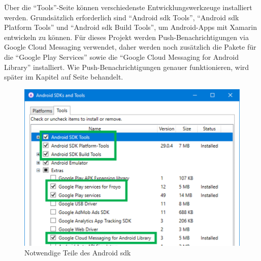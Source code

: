 Über die \enquote{Tools}-Seite können verschiedenste Entwicklungswerkzeuge installiert werden.
Grundsätzlich erforderlich sind \enquote{Android \acs{sdk} Tools}, \enquote{Android \acs{sdk} Platform Tools} und \enquote{Android \acs{sdk} Build Tools}, um Android-Apps mit Xamarin entwickeln zu können.
Für dieses Projekt werden Push-Benachrichtigungen via Google Cloud Messaging verwendet, daher werden noch zusätzlich die Pakete für die \enquote{Google Play Services} sowie die \enquote{Google Cloud Messaging for Android Library} installiert.
Wie Push-Benachrichtigungen genauer funktionieren, wird später im Kapitel  auf Seite \pageref{ch:push} behandelt.
\begin{figure}[H]
    \centering\includegraphics[width=0.8\linewidth]{images/auswahl_rahmenwerk/android_sdk_auswahl.png}    
    \caption{Notwendige Teile des Android \acs{sdk}}
\end{figure}

